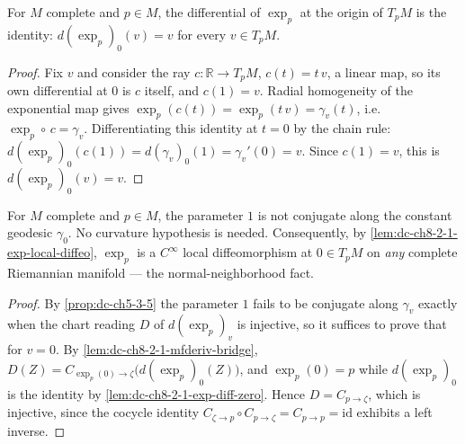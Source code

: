 \begin{lemma}
  \label{lem:dc-ch8-2-1-exp-diff-zero}


  For $M$ complete and $p\in M$, the differential of $\exp_p$ at the origin of $T_pM$ is the
  identity: $d(\exp_p)_0(v)=v$ for every $v\in T_pM$.
\end{lemma}
\begin{proof}

\sketch
  Fix $v$ and consider the ray $c:\mathbb R\to T_pM$, $c(t)=t\,v$, a linear map, so its own
  differential at $0$ is $c$ itself, and $c(1)=v$. Radial homogeneity of the exponential map gives
  $\exp_p(c(t))=\exp_p(t\,v)=\gamma_v(t)$, i.e. $\exp_p\circ\,c=\gamma_v$. Differentiating this
  identity at $t=0$ by the chain rule:
  $d(\exp_p)_0(c(1))=d(\gamma_v)_0(1)=\gamma_v'(0)=v$.
  Since $c(1)=v$, this is $d(\exp_p)_0(v)=v$.
\end{proof}

\begin{lemma}
  \label{lem:dc-ch8-2-1-no-conjugate-zero}


  For $M$ complete and $p\in M$, the parameter $1$ is not conjugate along the constant geodesic
  $\gamma_0$. No curvature hypothesis is needed. Consequently, by
  \cref{lem:dc-ch8-2-1-exp-local-diffeo}, $\exp_p$ is a $C^\infty$ local diffeomorphism at
  $0\in T_pM$ on \emph{any} complete Riemannian manifold --- the normal-neighborhood fact.

\end{lemma}
\begin{proof}

\sketch
  By \cref{prop:dc-ch5-3-5} the parameter $1$ fails to be conjugate along $\gamma_v$ exactly when
  the chart reading $D$ of $d(\exp_p)_v$ is injective, so it suffices to prove that for $v=0$. By
  \cref{lem:dc-ch8-2-1-mfderiv-bridge}, $D(Z)=C_{\exp_p(0)\to\zeta}\big(d(\exp_p)_0(Z)\big)$, and
  $\exp_p(0)=p$ while $d(\exp_p)_0$ is the identity by \cref{lem:dc-ch8-2-1-exp-diff-zero}. Hence
  $D=C_{p\to\zeta}$, which is injective, since the cocycle identity
  $C_{\zeta\to p}\circ C_{p\to\zeta}=C_{p\to p}=\mathrm{id}$ exhibits a left inverse.
\end{proof}

